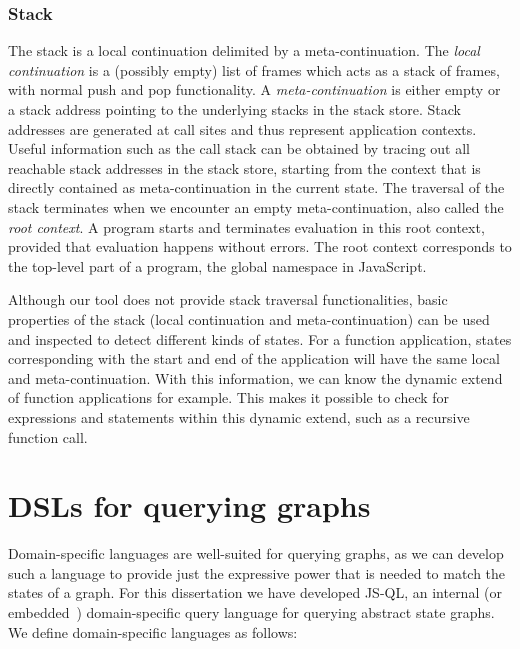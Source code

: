\subsubsection*{Stack}

The stack is a local continuation delimited by a meta-continuation. The \textit{local continuation} is a (possibly empty) list of frames which acts as a stack of frames, with normal push and pop functionality. A \textit{meta-continuation} is either empty or a stack address pointing to the underlying stacks in the stack store. Stack addresses are generated at call sites and thus represent application contexts. Useful information such as the call stack can be obtained by tracing out all reachable stack addresses in the stack store, starting from the context that is directly contained as meta-continuation in the current state. The traversal of the stack terminates when we encounter an empty meta-continuation, also called the \textit{root context}. A program starts and terminates evaluation in this root context, provided that evaluation happens without errors. The root context corresponds to the top-level part of a program, the global namespace in JavaScript.

Although our tool does not provide stack traversal functionalities, basic properties of the stack (local continuation and meta-continuation) can be used and inspected to detect different kinds of states. For a function application, states corresponding with the start and end of the application will have the same local and meta-continuation. With this information, we can know the dynamic extend of function applications for example. This makes it possible to check for expressions and statements within this dynamic extend, such as a recursive function call.

\section{DSLs for querying graphs}
\label{sec:DSLForQueryingGraphs}

Domain-specific languages are well-suited for querying graphs, as we can develop such a language to provide just the expressive power that is needed to match the states of a graph. For this dissertation we have developed JS-QL, an internal (or embedded~\cite{Hudak:1996}) domain-specific query language for querying abstract state graphs. We define domain-specific languages as follows:

